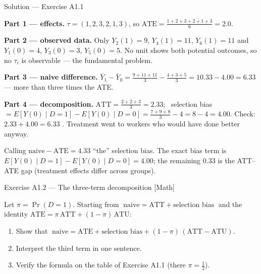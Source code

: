 \documentclass[aspectratio=169,11pt]{beamer}
\begin{document}
\begin{frame}{Solution --- Exercise A1.1}
\begin{solutionbox}
  \textbf{Part 1 --- effects.} $\tau = (1,2,3,2,1,3)$, so
  $\text{ATE} = \tfrac{1+2+3+2+1+3}{6} = \mathbf{2.0}$.

  \smallskip
  \textbf{Part 2 --- observed data.} Only $Y_2(1)=9$, $Y_4(1)=11$, $Y_6(1)=11$ and
  $Y_1(0)=4$, $Y_3(0)=3$, $Y_5(0)=5$. No unit shows both potential outcomes, so no
  $\tau_i$ is observable --- the fundamental problem.

  \smallskip
  \textbf{Part 3 --- naive difference.}
  $\bar Y_1 - \bar Y_0 = \tfrac{9+11+11}{3} - \tfrac{4+3+5}{3} = 10.33 - 4.00 = \mathbf{6.33}$
  --- more than three times the ATE.

  \smallskip
  \textbf{Part 4 --- decomposition.}
  $\text{ATT} = \tfrac{2+2+3}{3} = 2.33$; \ selection bias
  $= E[Y(0)\mid D{=}1] - E[Y(0)\mid D{=}0] = \tfrac{7+9+8}{3} - 4 = 8 - 4 = 4.00$.
  Check: $2.33 + 4.00 = 6.33$ \checkmark. Treatment went to workers who would have done
  better anyway.
\end{solutionbox}
\begin{mistake}
  Calling $\text{naive} - \text{ATE} = 4.33$ ``the'' selection bias. The exact bias term is
  $E[Y(0)\mid D{=}1]-E[Y(0)\mid D{=}0]=4.00$; the remaining $0.33$ is the ATT--ATE gap
  (treatment effects differ across groups).
\end{mistake}
\end{frame}

\begin{frame}{Exercise A1.2 --- The three-term decomposition [Math]}
\begin{exercise}
  Let $\pi = \Pr(D=1)$. Starting from
  $\;\text{naive} = \text{ATT} + \text{selection bias}\;$ and the identity
  $\text{ATE} = \pi\,\text{ATT} + (1-\pi)\,\text{ATU}$:
  \begin{enumerate}
    \item Show that
          $\;\text{naive} = \text{ATE} + \text{selection bias} +
          (1-\pi)\,(\text{ATT}-\text{ATU})$.
    \item Interpret the third term in one sentence.
    \item Verify the formula on the table of Exercise A1.1 (there $\pi = \tfrac12$).
  \end{enumerate}
\end{exercise}
\end{frame}
\end{document}
